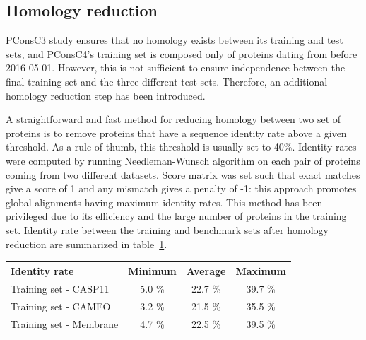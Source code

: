   \subsection{Homology reduction} \label{homologyreduction}

    PConsC3 study ensures that no homology exists between its training and test sets,
    and PConsC4's training set is composed only of proteins dating from before
    2016-05-01. However, this is not sufficient to ensure independence between the final
    training set and the three different test sets. Therefore, an additional homology
    reduction step has been introduced.

    A straightforward and fast method for reducing homology between two set of proteins is to
    remove proteins that have a sequence identity rate above a given threshold.
    As a rule of thumb, this threshold is usually set to 40\%.
    Identity rates were computed by running Needleman-Wunsch algorithm on each
    pair of proteins coming from two different datasets. Score matrix was set
    such that exact matches give a score of 1 and any mismatch gives a penalty of -1:
    this approach promotes global alignments having maximum identity rates.
    This method has been privileged due to its efficiency and the large number of proteins
    in the training set.
    Identity rate between the training and benchmark sets after homology reduction are summarized
    in table~\ref{identityrates}.

    \begin{table}[H]
      \centering
      \begin{tabular}{|l|c|c|c|}
        \hline
        Identity rate & Minimum & Average & Maximum \\
        \hline
        \hline
        Training set - CASP11   & 5.0 \% & 22.7 \% & 39.7 \% \\
        Training set - CAMEO    & 3.2 \% & 21.5 \% & 35.5 \% \\
        Training set - Membrane & 4.7 \% & 22.5 \% & 39.5 \% \\
        \hline
      \end{tabular}
      \label{identityrates}
    \end{table}

